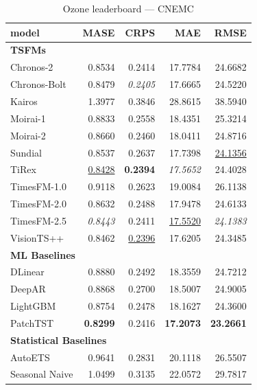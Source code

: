 \begin{table}[H]
\caption{Ozone leaderboard --- CNEMC}
\centering
\begin{small}
\begin{tabular}{lrrrr}
\toprule
model & MASE & CRPS & MAE & RMSE \\
\midrule
\multicolumn{5}{l}{\textbf{TSFMs}} \\
Chronos-2 & 0.8534 & 0.2414 & 17.7784 & 24.6682 \\
Chronos-Bolt & 0.8479 & \textit{0.2405} & 17.6665 & 24.5220 \\
Kairos & 1.3977 & 0.3846 & 28.8615 & 38.5940 \\
Moirai-1 & 0.8833 & 0.2558 & 18.4351 & 25.3214 \\
Moirai-2 & 0.8660 & 0.2460 & 18.0411 & 24.8716 \\
Sundial & 0.8537 & 0.2637 & 17.7398 & \underline{24.1356} \\
TiRex & \underline{0.8428} & \textbf{0.2394} & \textit{17.5652} & 24.4028 \\
TimesFM-1.0 & 0.9118 & 0.2623 & 19.0084 & 26.1138 \\
TimesFM-2.0 & 0.8632 & 0.2488 & 17.9478 & 24.6133 \\
TimesFM-2.5 & \textit{0.8443} & 0.2411 & \underline{17.5520} & \textit{24.1383} \\
VisionTS++ & 0.8462 & \underline{0.2396} & 17.6205 & 24.3485 \\
\midrule
\multicolumn{5}{l}{\textbf{ML Baselines}} \\
DLinear & 0.8880 & 0.2492 & 18.3559 & 24.7212 \\
DeepAR & 0.8868 & 0.2700 & 18.5007 & 24.9005 \\
LightGBM & 0.8754 & 0.2478 & 18.1627 & 24.3600 \\
PatchTST & \textbf{0.8299} & 0.2416 & \textbf{17.2073} & \textbf{23.2661} \\
\midrule
\multicolumn{5}{l}{\textbf{Statistical Baselines}} \\
AutoETS & 0.9641 & 0.2831 & 20.1118 & 26.5507 \\
Seasonal Naive & 1.0499 & 0.3135 & 22.0572 & 29.7817 \\
\bottomrule
\end{tabular}
\end{small}
\end{table}